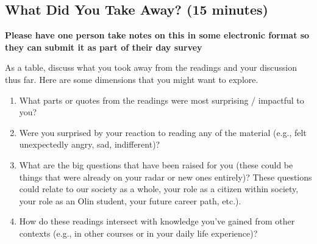 \subsection{What Did You Take Away? (15 minutes)}

\textbf{Please have one person take notes on this in some electronic format so they can submit it as part of their day survey}

As a table, discuss what you took away from the readings and your discussion thus far.  Here are some dimensions that you might want to explore.
\begin{enumerate}
\item What parts or quotes from the readings were most surprising / impactful to you?
\item Were you surprised by your reaction to reading any of the material (e.g., felt unexpectedly angry, sad, indifferent)?
\item What are the big questions that have been raised for you (these could be things that were already on your radar or new ones entirely)?  These questions could relate to our society as a whole, your role as a citizen within society, your role as an Olin student, your future career path, etc.).
\item How do these readings intersect with knowledge you've gained from other contexts (e.g., in other courses or in your daily life experience)?
\end{enumerate}


%
%
%

